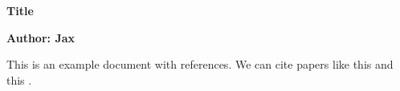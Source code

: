 \documentclass{article}
\begin{document}

\Huge\textbf{Title}

\normalsize\textbf{Author: Jax}

\vspace{1cm}

This is an example document with references. We can cite papers like this \cite{example2023} and this \cite{sample2022}.



\printbibliography
\end{document}
